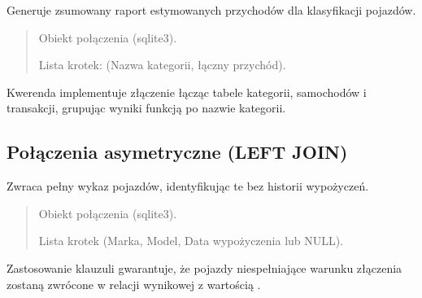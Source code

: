 \documentclass[a4paper,11pt,english,openany,oneside]{sphinxmanual}
\begin{document}
\begin{savenotes}\begin{fulllineitems}

\pysigstartsignatures
\pysiglinewithargsret
{}
{}
{}
\pysigstopsignatures
\sphinxAtStartPar
Generuje zsumowany raport estymowanych przychodów dla klasyfikacji pojazdów.
\begin{quote}\begin{description}
\sphinxAtStartPar
{} \textendash{} Obiekt połączenia (sqlite3).

\sphinxAtStartPar
Lista krotek: (Nazwa kategorii, łączny przychód).

\end{description}\end{quote}

\sphinxAtStartPar
{} Kwerenda implementuje złączenie  łącząc tabele kategorii, samochodów i transakcji, grupując wyniki funkcją  po nazwie kategorii.

\end{fulllineitems}\end{savenotes}



\subsection{Połączenia asymetryczne (LEFT JOIN)}
\label{\detokenize{rozdzial_5/index:polaczenia-asymetryczne-left-join}}

\begin{savenotes}\begin{fulllineitems}

\pysigstartsignatures
\pysiglinewithargsret
{}
{}
{}
\pysigstopsignatures
\sphinxAtStartPar
Zwraca pełny wykaz pojazdów, identyfikując te bez historii wypożyczeń.
\begin{quote}\begin{description}
\sphinxAtStartPar
{} \textendash{} Obiekt połączenia (sqlite3).

\sphinxAtStartPar
Lista krotek (Marka, Model, Data wypożyczenia lub NULL).

\end{description}\end{quote}

\sphinxAtStartPar
{} Zastosowanie klauzuli  gwarantuje, że pojazdy niespełniające warunku złączenia zostaną zwrócone w relacji wynikowej z wartością .

\end{fulllineitems}\end{savenotes}
\end{document}
